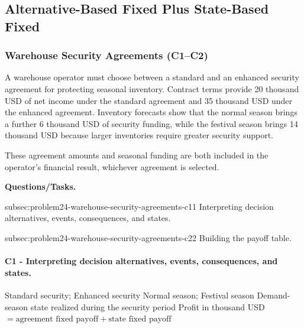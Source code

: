 	
	\subsection{Alternative-Based Fixed Plus State-Based Fixed}
	\label{sec:alternative-based-fixed-payoff-plus-state-based-fixed-payoff}



	\subsubsection{Warehouse Security Agreements (C1--C2)}
	\label{sec:problem24-warehouse-security-agreements-c1-c2}
	
	A warehouse operator must choose between a standard and an enhanced security agreement for protecting seasonal inventory. Contract terms provide 20 thousand USD of net income under the standard agreement and 35 thousand USD under the enhanced agreement. Inventory forecasts show that the normal season brings a further 6 thousand USD of security funding, while the festival season brings 14 thousand USD because larger inventories require greater security support.
	
	These agreement amounts and seasonal funding are both included in the operator’s financial result, whichever agreement is selected.

	\textbf{Questions/Tasks.}
	\begin{enumerate}
		\CriterionTask
		{subsec:problem24-warehouse-security-agreements-c1}{1}
		{Interpreting decision alternatives, events, consequences, and states.}

		\CriterionTask
		{subsec:problem24-warehouse-security-agreements-c2}{2}
		{Building the payoff table.}
	\end{enumerate}

\paragraph*{C1 - Interpreting decision alternatives, events, consequences, and states.}
	\label{subsec:problem24-warehouse-security-agreements-c1}
	\DecisionElementsTable
	{Standard security; Enhanced security}
	{Normal season; Festival season}
	{Demand-season state realized during the security period}
	{Profit in thousand USD $= \text{agreement fixed payoff} + \text{state fixed payoff}$}

